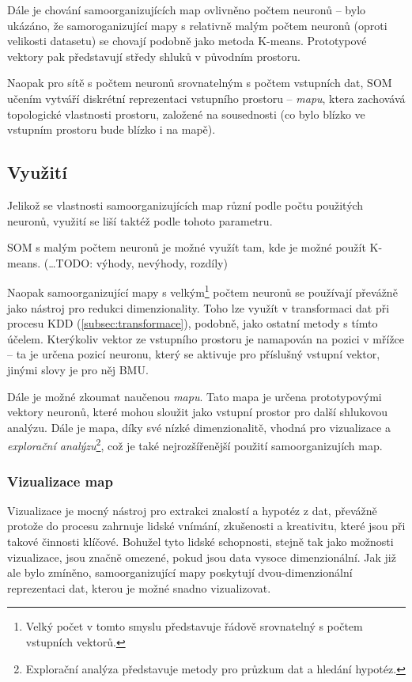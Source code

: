 \documentclass[thesis=M,czech]{FITthesis}[2012/06/26]
\begin{document}
Dále je chování samoorganizujících map ovlivněno počtem neuronů -- bylo ukázáno, že samoroganizující mapy s relativně malým počtem neuronů (oproti velikosti datasetu) se chovají podobně jako metoda K-means\cite{needed}. Prototypové vektory pak  představují středy shluků v původním prostoru.

Naopak pro sítě s počtem neuronů srovnatelným s počtem vstupních dat, SOM učením vytváří diskrétní reprezentaci vstupního prostoru -- \textit{mapu}, ktera zachovává topologické vlastnosti prostoru, založené na sousednosti (co bylo blízko ve vstupním prostoru bude blízko i na mapě).



\subsection{Využití}

Jelikož se vlastnosti samoorganizujících map různí podle počtu použitých neuronů, využití se liší taktéž podle tohoto parametru.

SOM s malým počtem neuronů je možné využít tam, kde je možné použít K-means. (\dots TODO: výhody, nevýhody, rozdíly)


Naopak samoorganizující mapy s velkým\footnote{Velký počet v tomto smyslu představuje řádově srovnatelný s počtem vstupních vektorů.} počtem neuronů se používají převážně jako nástroj pro redukci dimenzionality.  Toho lze využít v transformaci dat při procesu KDD (\ref{subsec:transformace}), podobně, jako ostatní metody s tímto účelem\cite{som_dim_red}. Kterýkoliv vektor ze vstupního prostoru je namapován na pozici v mřížce -- ta je určena pozicí neuronu, který se aktivuje pro příslušný vstupní vektor, jinými slovy je pro něj BMU.


Dále je možné zkoumat naučenou \textit{mapu}. Tato mapa je určena prototypovými vektory neuronů, které mohou sloužit jako vstupní prostor pro další shlukovou analýzu\cite{som_clustering}. Dále je mapa, díky své nízké dimenzionalitě, vhodná pro vizualizace a 
\textit{explorační analýzu}\footnote{Explorační analýza představuje metody pro průzkum dat a hledání hypotéz.}, což je také nejrozšířenější použití samoorganizujích map.



\subsubsection*{Vizualizace map}
Vizualizace je mocný nástroj pro extrakci znalostí a hypotéz z dat, převážně protože do procesu zahrnuje lidské vnímání, zkušenosti a kreativitu, které jsou při takové činnosti klíčové\cite{visual}. Bohužel tyto lidské schopnosti, stejně tak jako možnosti vizualizace, jsou značně omezené, pokud jsou data vysoce dimenzionální. Jak již ale bylo zmíněno, samoorganizující mapy poskytují dvou-dimenzionální reprezentaci dat, kterou je možné snadno vizualizovat.
\end{document}
